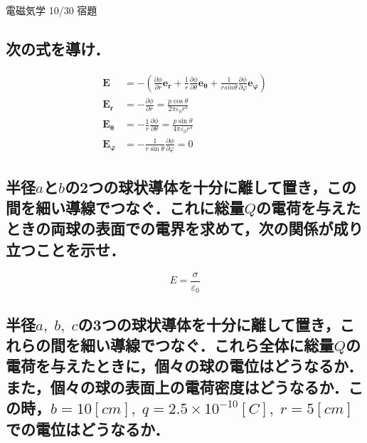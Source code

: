 \documentclass[a4j,12pt]{jsarticle}
\begin{document}
\begin{center}
    \begin{LARGE}
        {\huge 電磁気学 10/30 宿題} 
    \end{LARGE}
\end{center}

\subsection{次の式を導け．}
\vspace*{-2em}
\begin{align}
    \bm{E} &= -\left(\frac{\partial \phi}{\partial r}\bm{e_r}+\frac{1}{r}\frac{\partial \phi}{\partial \theta}\bm{e_\theta}+\frac{1}{rsin\theta}\frac{\partial \phi}{\partial \varphi}\bm{e_\varphi}\right) \\
    \bm{E_r} &= -\frac{\partial \phi}{\partial r} = \frac{p\cos\theta}{2\pi\varepsilon_0r^3} \\
    \bm{E_\theta} &= -\frac{1}{r}\frac{\partial \phi}{\partial \theta} = \frac{p\sin\theta}{4\pi\varepsilon_0r^3} \\
    \bm{E_\varphi} &= -\frac{1}{r\sin\theta}\frac{\partial \phi}{\partial \varphi} = 0
\end{align}

\newpage

\subsection{半径\(a\)と\(b\)の2つの球状導体を十分に離して置き，この間を細い導線でつなぐ．これに総量\(Q\)の電荷を与えたときの両球の表面での電界を求めて，次の関係が成り立つことを示せ．}
\vspace*{-1em}
\begin{equation}
E=\frac{\sigma}{\varepsilon_0}
\end{equation}

\vspace{18em}

\subsection{半径\(a,\;b,\;c\)の3つの球状導体を十分に離して置き，これらの間を細い導線でつなぐ．これら全体に総量\(Q\)の電荷を与えたときに，個々の球の電位はどうなるか．また，個々の球の表面上の電荷密度はどうなるか．この時，\(b=10\si{[cm]},\;q=2.5\times10^{-10}\si{[C]},\;r=5\si{[cm]}\)での電位はどうなるか．}
\end{document}
